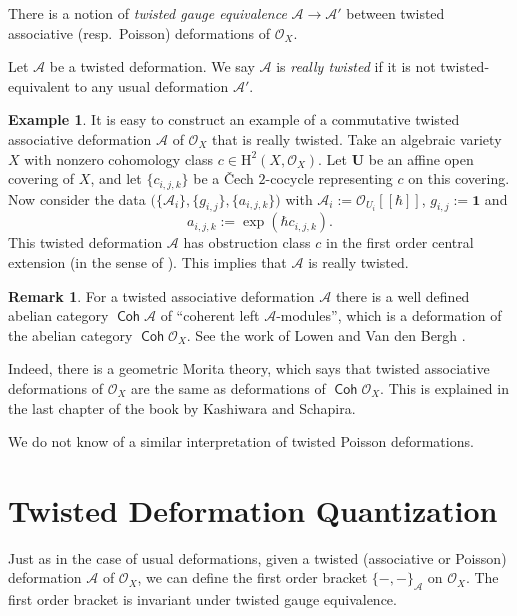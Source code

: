 \documentclass{conm-p-l}
\theoremstyle{definition}
\newtheorem{rem}[equation]{Remark}
\newtheorem{exa}[equation]{Example}
\numberwithin{equation}{section}
\newcommand{\opn}{\operatorname}
\newcommand{\cat}[1]{\operatorname{\mathsf{#1}}}
\newcommand{\mcal}[1]{\mathcal{#1}}
\newcommand{\mrm}[1]{\mathrm{#1}}
\newcommand{\bsym}[1]{\boldsymbol{#1}}
\begin{document}
There is a notion of {\em twisted gauge equivalence} 
$\bsym{\mcal{A}} \to \bsym{\mcal{A}'}$ between twisted
associative (resp.\ Poisson) deformations of $\mcal{O}_X$. 

Let $\bsym{\mcal{A}}$ be a twisted deformation.
We say $\bsym{\mcal{A}}$ is {\em really twisted} if
it is not twisted-equivalent to any usual deformation $\mcal{A}'$. 

\begin{exa} 
It is easy to construct an example of a commutative twisted associative
deformation $\bsym{\mcal{A}}$ of $\mcal{O}_X$ that is really
twisted. Take an algebraic variety $X$ with nonzero cohomology
class $c \in \mrm{H}^2(X, \mcal{O}_X)$. 
Let $\bsym{U}$ be an affine open covering of $X$, and let
$\{ c_{i, j, k} \}$ be a \v{C}ech $2$-cocycle representing $c$
on this covering. Now consider the data
$\bigl( \{ \mcal{A}_i \}, \{ g_{i, j} \}, \{ a_{i, j, k} \} \bigr)$
with $\mcal{A}_i := \mcal{O}_{U_i}[[\hbar]]$, 
$g_{i, j} := \bsym{1}$ and
\[ a_{i, j, k} := \opn{exp}(\hbar c_{i, j, k}) . \]
This twisted deformation $\bsym{\mcal{A}}$ has obstruction
class $c$ in the first order central extension (in the sense of \cite{Ye6}).
This implies that $\bsym{\mcal{A}}$ is really twisted. 
\end{exa}

\begin{rem} \label{rem1}
For a twisted associative deformation $\bsym{\mcal{A}}$
there is a well defined abelian category 
$\cat{Coh} \bsym{\mcal{A}}$ of ``coherent left
$\bsym{\mcal{A}}$-modules'', which is a deformation of the 
abelian category $\cat{Coh} \mcal{O}_X$. See the work of Lowen and
Van den Bergh \cite{LV}.

Indeed, there is a
geometric Morita theory, which says that twisted associative
deformations of $\mcal{O}_X$ are the same as deformations of 
$\cat{Coh} \mcal{O}_X$. This is explained in the last chapter of the book
\cite{KS1} by Kashiwara and Schapira.

We do not know of a similar interpretation of twisted Poisson
deformations. 
\end{rem}




\section{Twisted Deformation Quantization}

Just as in the case of usual deformations, given a 
twisted (associative or Poisson) deformation $\bsym{\mcal{A}}$ 
of $\mcal{O}_X$, we can define the first order bracket 
$\{ -,- \}_{\bsym{\mcal{A}}}$ on $\mcal{O}_X$. The first order bracket is
invariant under twisted gauge equivalence.
\end{document}
